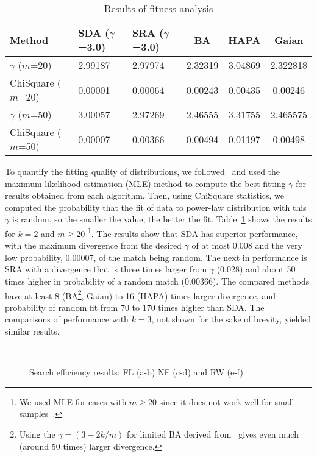 \documentclass[10pt,journal,cspaper,compsoc]{IEEEtran}
\begin{document}
\begin{table}[hbtp]
\begin{center}
\begin{tabular}{|p{1.2cm}|p{0.9cm}|p{0.9cm}|c|c|c|}
\hline Method & SDA ($\gamma$=3.0)  & SRA ($\gamma$=3.0) & BA & HAPA & Gaian \\ \hline \hline
$\gamma$ ($m$=20) & 2.99187 & 2.97974 & 2.32319 & 3.04869 & 2.322818 \\ \hline
ChiSquare ($m$=20) & 0.00001 & 0.00064 & 0.00243 & 0.00435 & 0.00246 \\ \hline
$\gamma$ ($m$=50) &  3.00057 & 2.97269 & 2.46555 & 3.31755 & 2.465575 \\ \hline
ChiSquare ($m$=50) & 0.00007 & 0.00366 & 0.00494 & 0.01197 & 0.00498 \\ \hline
\end{tabular}
\end{center}
\caption{Results of fitness analysis}
\label{table:mle}
\end{table}

To quantify the fitting quality of distributions, we followed~\cite{powerlaw1} and used the maximum likelihood estimation (MLE) method to compute the best fitting $\gamma$ for results obtained from each algorithm. Then, using ChiSquare statistics, we computed the probability that the fit of data to power-law distribution with this $\gamma$ is random, so the smaller the value, the better the fit. Table~\ref{table:mle} shows the results for $k=2$ and $m\geq20$ \footnote{We used MLE for cases with $m\geq 20$ since it does not work well for small samples~\cite{powerlaw1}.}. The results show that SDA has superior performance, with the maximum divergence from the desired $\gamma$ of at most 0.008 and the very low probability, 0.00007, of the match being random. The next in performance is SRA with a divergence that is three times larger from $\gamma$ (0.028) and about 50 times higher in probability of a random match (0.00366). The compared methods have at least 8 (BA\footnote{Using the $\gamma = (3-2k/m)$ for limited BA derived from~\cite{guclu} gives even much (around 50 times) larger divergence.}, Gaian) to 16 (HAPA) times larger divergence, and probability of random fit from 70 to 170 times higher than SDA. The comparisons of performance with $k=3$, not shown for the sake of brevity, yielded similar results.


\begin{figure*}
\centering
{}
\\
\caption{Search efficiency results: FL (a-b) NF (c-d) and RW (e-f)}
\label{fig:comparison}
\end{figure*}
\end{document}
